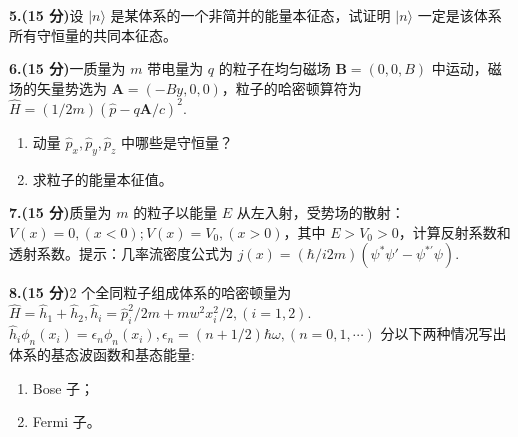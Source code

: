 \textbf{5.(15 分)}设 $|n\rangle$ 是某体系的一个非简并的能量本征态，试证明 $|n\rangle$ 一定是该体系所有守恒量的共同本征态。

\textbf{6.(15 分)}一质量为 $m$ 带电量为 $q$ 的粒子在均匀磁场 $\mathbf{B} = (0,0,B)$ 中运动，磁场的矢量势选为 $\mathbf{A} = (-By,0,0)$，粒子的哈密顿算符为 $\hat{H} = (1/2m)(\hat{p} - q\mathbf{A}/c)^2$.
    \begin{enumerate}
        \item 动量 $\hat{p}_x, \hat{p}_y, \hat{p}_z$ 中哪些是守恒量？
        \item 求粒子的能量本征值。
    \end{enumerate}

\textbf{7.(15 分)}质量为 $m$ 的粒子以能量 $E$ 从左入射，受势场的散射：$V(x) = 0, (x < 0); V(x) = V_0, (x > 0)$，其中 $E > V_0 > 0$，计算反射系数和透射系数。提示：几率流密度公式为 $j(x) = (\hbar/i2m)(\psi^*\psi' - \psi^{*'}\psi)$.

\textbf{8.(15 分)}2 个全同粒子组成体系的哈密顿量为 $\hat{H} = \hat{h}_1 + \hat{h}_2, \hat{h}_i = \hat{p}_i^2/2m + mw^2 x_i^2/2, (i = 1,2)$. $\hat{h}_i \phi_n(x_i) = \epsilon_n \phi_n(x_i), \epsilon_n = (n + 1/2)\hbar \omega, (n = 0,1,\cdots)$ 分以下两种情况写出体系的基态波函数和基态能量: 
    \begin{enumerate}
        \item  Bose 子；
        \item  Fermi 子。
    \end{enumerate}